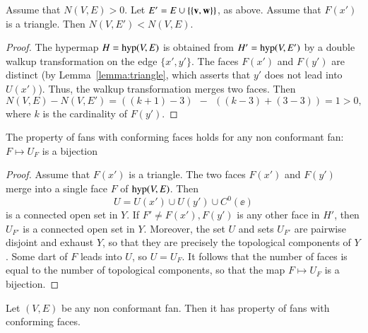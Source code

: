 
\begin{lemma} 
Assume that $N(V,E)>0$.  Let $E'=E\cup \{\{{\mathbf v},{\mathbf w}\}\}$, as above.  Assume that $F(x')$  is a triangle. Then $N(V,E')<N(V,E)$.
\end{lemma}


\begin{proof}    The hypermap $H={\operatorname{hyp}}(V,E)$ is obtained from $H'={\operatorname{hyp}}(V,E')$ by a double walkup transformation on the edge $\{x',y'\}$.    The faces $F(x')$ and $F(y')$ are distinct (by Lemma~\ref{lemma:triangle}, which asserts that $y'$ does not lead into $U(x')$).  Thus, the walkup transformation merges two faces.   Then 
$$N(V,E) - N(V,E') = ((k+1)-3) ~~-~~ ((k-3) + (3-3)) = 1 >0,$$
where $k$ is the cardinality of $F(y')$.
\end{proof}


\begin{lemma}
The property  of fans with conforming faces  holds for any non conformant fan:
$F\mapsto U_F$ is a bijection
\end{lemma}

\begin{proof}
Assume that $F(x')$ is a triangle.
The two faces $F(x')$ and $F(y')$ merge into a single face $F$ of ${\operatorname{hyp}}(V,E)$.
Then 
\begin{equation}\label{eqn:U}
U= U(x')\cup U(y')\cup C^0(\ee)
\end{equation} 
is a connected open set in $Y$.
If $F'\ne F(x'),F(y')$ is any other face in $H'$, then $U_{F'}$ is
a connected open set in $Y$.  Moreover, the set $U$ and sets $U_{F'}$
are pairwise disjoint and exhaust $Y$, so that they are precisely the topological
components of $Y$.  Some dart of $F$ leads into $U$, so $U=U_F$.  It follows
that the number of faces is equal to the number of topological components, so that the map $F\mapsto U_F$ is a bijection.
\end{proof}


\begin{lemma}  Let $(V,E)$ be any non conformant fan.  Then it has property  of fans with conforming faces.
\end{lemma}

